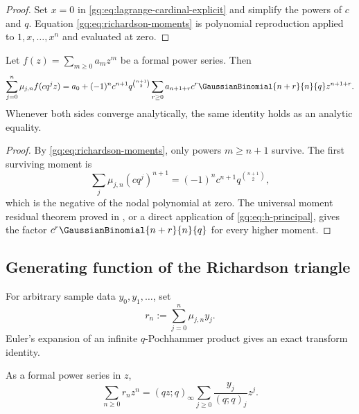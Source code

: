 \begin{proof}
Set $x=0$ in \eqref{gq:eq:lagrange-cardinal-explicit} and simplify the powers of
$c$ and $q$.  Equation \eqref{gq:eq:richardson-moments} is polynomial
reproduction applied to $1,x,\ldots,x^n$ and evaluated at zero.
\end{proof}

\begin{theorem}
\label{gq:thm:richardson-tail}
Let $f(z)=\sum_{m\ge0}a_mz^m$ be a formal power series.  Then
\begin{equation}
 \sum_{j=0}^n\mu_{j,n}f(cq^jz)
 =a_0+(-1)^nc^{n+1}q^{\binom{n+1}{2}}
 \sum_{r\ge0}a_{n+1+r}c^r\GaussianBinomial{n+r}{n}{q}z^{n+1+r}.
 \label{gq:eq:richardson-tail}
\end{equation}
Whenever both sides converge analytically, the same identity holds as an
analytic equality.
\end{theorem}

\begin{proof}
By \eqref{gq:eq:richardson-moments}, only powers $m\ge n+1$ survive.  The first
surviving moment is
\[
 \sum_j\mu_{j,n}(cq^j)^{n+1}
 =(-1)^nc^{n+1}q^{\binom{n+1}{2}},
\]
which is the negative of the nodal polynomial at zero.  The universal moment
residual theorem proved in , or a direct
application of \eqref{gq:eq:h-principal}, gives the factor
$c^r\GaussianBinomial{n+r}{n}{q}$ for every higher moment.
\end{proof}

\subsection{Generating function of the Richardson triangle}

For arbitrary sample data $y_0,y_1,\ldots$, set
\begin{equation}
 r_n:=\sum_{j=0}^n\mu_{j,n}y_j.
 \label{gq:eq:richardson-output}
\end{equation}
Euler's expansion of an infinite $q$-Pochhammer product gives an exact
transform identity.

\begin{theorem}
\label{gq:thm:richardson-generating}
As a formal power series in $z$,
\begin{equation}
 \boxed{
 \sum_{n\ge0}r_nz^n
 =(qz;q)_\infty
  \sum_{j\ge0}\frac{y_j}{(q;q)_j}z^j.}
 \label{gq:eq:richardson-generating}
\end{equation}
\end{theorem}

